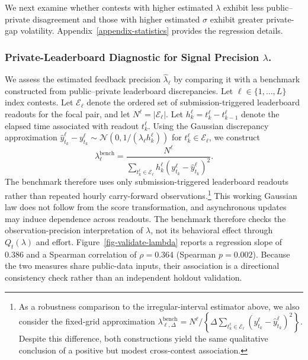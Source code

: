 \documentclass[mnsc]{informs3}
\begin{document}
{We next examine whether contests with higher estimated $\lambda$ exhibit less public--private disagreement and those with higher estimated $\sigma$ exhibit greater private-gap volatility. Appendix~\ref{appendix-statistics} provides the regression details.}

\subsubsection{Private-Leaderboard Diagnostic for Signal Precision $\lambda$.}
{We assess the estimated feedback precision $\hat\lambda_\ell$ by comparing it with a benchmark constructed from public--private leaderboard discrepancies.}
Let $\ell\in\{1,\ldots,L\}$ index contests.
Let $\mathcal E_\ell$ denote the ordered set of submission-triggered leaderboard readouts for the focal pair, and let $N^\ell=|\mathcal E_\ell|$.
Let $h_k^\ell=t_k^\ell-t_{k-1}^\ell$ denote the elapsed time associated with readout $t_k^\ell$.
{Using the Gaussian discrepancy approximation $\hat y_{t_k}^\ell-y_{t_k}^\ell\sim\mathcal N\!\left(0,1/(\lambda_\ell h_k^\ell)\right)$ for $t_k^\ell\in\mathcal E_\ell$, we construct}
\begin{equation*}
\lambda^{\text{bench}}_\ell =
\frac{N^\ell}
{\sum_{t_k^\ell\in\mathcal E_\ell}
h_k^\ell (y_{t_k}^\ell - \hat{y}_{t_k}^\ell)^2}.
\end{equation*}
The benchmark therefore uses only submission-triggered leaderboard readouts rather than repeated hourly carry-forward observations.\footnote{
As a robustness comparison to the irregular-interval estimator above, we also consider the fixed-grid approximation $\lambda_{\ell,\Delta}^{\mathrm{bench}}=N^\ell/\left\{\Delta\sum_{t_k^\ell\in\mathcal E_\ell}(y_{t_k}^\ell-\hat y_{t_k}^\ell)^2\right\}$.
Despite this difference, both constructions yield the same qualitative conclusion of a positive but modest cross-contest association.
}
{This working Gaussian law does not follow from the score transformation, and asynchronous updates may induce dependence across readouts. The benchmark therefore checks the observation-precision interpretation of $\lambda$, not its behavioral effect through $Q_t(\lambda)$ and effort.}
Figure~\ref{fig-validate-lambda} reports a regression slope of $0.386$ and a Spearman correlation of $\rho=0.364$ (Spearman $p=0.002$). Because the two measures share public-data inputs, their association is a directional consistency check rather than an independent holdout validation.
\end{document}
